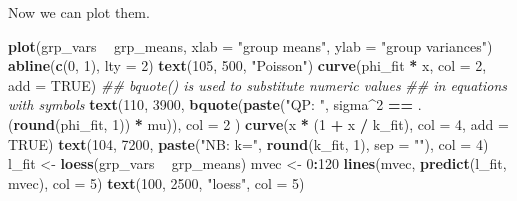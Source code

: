 \documentclass[
  12pt,
]{book}
\newenvironment{Shaded}{\begin{snugshade}}{\end{snugshade}}
\newcommand{\CommentTok}[1]{\textcolor[rgb]{0.56,0.35,0.01}{\textit{#1}}}
\newcommand{\DataTypeTok}[1]{\textcolor[rgb]{0.13,0.29,0.53}{#1}}
\newcommand{\DecValTok}[1]{\textcolor[rgb]{0.00,0.00,0.81}{#1}}
\newcommand{\KeywordTok}[1]{\textcolor[rgb]{0.13,0.29,0.53}{\textbf{#1}}}
\newcommand{\NormalTok}[1]{#1}
\newcommand{\OperatorTok}[1]{\textcolor[rgb]{0.81,0.36,0.00}{\textbf{#1}}}
\newcommand{\OtherTok}[1]{\textcolor[rgb]{0.56,0.35,0.01}{#1}}
\newcommand{\StringTok}[1]{\textcolor[rgb]{0.31,0.60,0.02}{#1}}
\begin{document}
Now we can plot them.

\begin{Shaded}
\begin{Highlighting}[]
\KeywordTok{plot}\NormalTok{(grp_vars }\OperatorTok{~}\StringTok{ }\NormalTok{grp_means, }\DataTypeTok{xlab =} \StringTok{"group means"}\NormalTok{, }\DataTypeTok{ylab =} \StringTok{"group variances"}\NormalTok{)}
\KeywordTok{abline}\NormalTok{(}\KeywordTok{c}\NormalTok{(}\DecValTok{0}\NormalTok{, }\DecValTok{1}\NormalTok{), }\DataTypeTok{lty =} \DecValTok{2}\NormalTok{)}
\KeywordTok{text}\NormalTok{(}\DecValTok{105}\NormalTok{, }\DecValTok{500}\NormalTok{, }\StringTok{"Poisson"}\NormalTok{)}
\KeywordTok{curve}\NormalTok{(phi_fit }\OperatorTok{*}\StringTok{ }\NormalTok{x, }\DataTypeTok{col =} \DecValTok{2}\NormalTok{, }\DataTypeTok{add =} \OtherTok{TRUE}\NormalTok{)}
\CommentTok{## bquote() is used to substitute numeric values}
\CommentTok{## in equations with symbols}
\KeywordTok{text}\NormalTok{(}\DecValTok{110}\NormalTok{, }\DecValTok{3900}\NormalTok{,}
  \KeywordTok{bquote}\NormalTok{(}\KeywordTok{paste}\NormalTok{(}\StringTok{"QP: "}\NormalTok{, sigma}\OperatorTok{^}\DecValTok{2} \OperatorTok{==}\StringTok{ }\NormalTok{.(}\KeywordTok{round}\NormalTok{(phi_fit, }\DecValTok{1}\NormalTok{)) }\OperatorTok{*}\StringTok{ }\NormalTok{mu)),}
  \DataTypeTok{col =} \DecValTok{2}
\NormalTok{)}
\KeywordTok{curve}\NormalTok{(x }\OperatorTok{*}\StringTok{ }\NormalTok{(}\DecValTok{1} \OperatorTok{+}\StringTok{ }\NormalTok{x }\OperatorTok{/}\StringTok{ }\NormalTok{k_fit), }\DataTypeTok{col =} \DecValTok{4}\NormalTok{, }\DataTypeTok{add =} \OtherTok{TRUE}\NormalTok{)}
\KeywordTok{text}\NormalTok{(}\DecValTok{104}\NormalTok{, }\DecValTok{7200}\NormalTok{, }\KeywordTok{paste}\NormalTok{(}\StringTok{"NB: k="}\NormalTok{, }\KeywordTok{round}\NormalTok{(k_fit, }\DecValTok{1}\NormalTok{), }\DataTypeTok{sep =} \StringTok{""}\NormalTok{), }\DataTypeTok{col =} \DecValTok{4}\NormalTok{)}
\NormalTok{l_fit <-}\StringTok{ }\KeywordTok{loess}\NormalTok{(grp_vars }\OperatorTok{~}\StringTok{ }\NormalTok{grp_means)}
\NormalTok{mvec <-}\StringTok{ }\DecValTok{0}\OperatorTok{:}\DecValTok{120}
\KeywordTok{lines}\NormalTok{(mvec, }\KeywordTok{predict}\NormalTok{(l_fit, mvec), }\DataTypeTok{col =} \DecValTok{5}\NormalTok{)}
\KeywordTok{text}\NormalTok{(}\DecValTok{100}\NormalTok{, }\DecValTok{2500}\NormalTok{, }\StringTok{"loess"}\NormalTok{, }\DataTypeTok{col =} \DecValTok{5}\NormalTok{)}
\end{Highlighting}
\end{Shaded}
\end{document}
